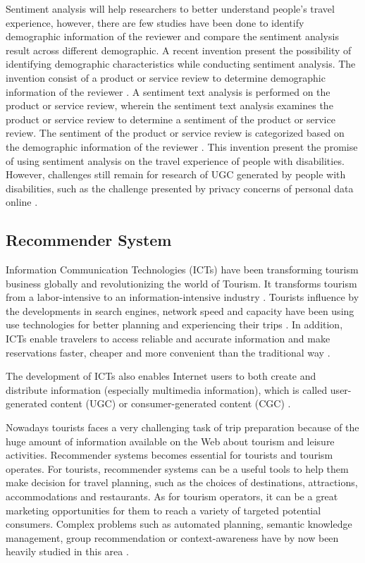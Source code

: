 Sentiment analysis will help researchers to better understand people's travel experience, however, there are few studies have been done to identify demographic information of the reviewer and compare the sentiment analysis result across different demographic. A recent invention present the possibility of identifying demographic characteristics while conducting sentiment analysis. The invention consist of a product or service review to determine demographic information of the reviewer \cite{Bhatt2014}. A sentiment text analysis is performed on the product or service review, wherein the sentiment text analysis examines the product or service review to determine a sentiment of the product or service review. The sentiment of the product or service review is categorized based on the demographic information of the reviewer \cite{Bhatt2014}. This invention present the promise of using sentiment analysis on the travel experience of people with disabilities. However, challenges still remain for research of UGC generated by people with disabilities, such as the challenge presented by privacy concerns of personal data online \cite{lazar}. 


\subsection{Recommender System}
Information Communication Technologies (ICTs) have been transforming tourism business
globally and revolutionizing the world of Tourism. It transforms tourism from a
labor-intensive to an information-intensive industry \cite{Williams201787}.
Tourists influence by the developments in search engines, network speed and capacity 
have been using use technologies for better planning and experiencing their
trips \cite{XIE2017101}. In addition, ICTs enable travelers to access reliable and
accurate information and make reservations faster, cheaper and more convenient than
the traditional way \cite{chung2009}.

The development of ICTs also enables Internet users to both create and distribute
information (especially multimedia information), which is called user-generated 
content (UGC) or consumer-generated content (CGC) \cite{chung2009}.

Nowadays tourists faces a very challenging task of trip preparation because of the
huge amount of information available on the Web about tourism and leisure activities.
Recommender systems becomes essential for tourists and tourism operates. For tourists,
recommender systems can be a useful tools to help them make decision for travel
planning, such as the choices of destinations, attractions, accommodations and
restaurants. As for tourism operators, it can be a great marketing opportunities for
them to reach a variety of targeted potential consumers. Complex problems such as
automated planning, semantic knowledge management, group recommendation or
context-awareness have by now been heavily studied in this area \cite{morenorecommender}. 

